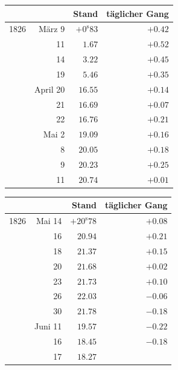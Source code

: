 \begin{center}
\begingroup\small\setlength{\tabcolsep}{5pt}
\begin{tabular}{lr|r|r}
 & & Stand & täglicher Gang \\
\hline
1826 & März 9 & $+0^{\mathrm s}83$ & $+0.42$ \\
 & 11 & $1.67$ & $+0.52$ \\
 & 14 & $3.22$ & $+0.45$ \\
 & 19 & $5.46$ & $+0.35$ \\
 & April 20 & $16.55$ & $+0.14$ \\
 & 21 & $16.69$ & $+0.07$ \\
 & 22 & $16.76$ & $+0.21$ \\
 & Mai 2 & $19.09$ & $+0.16$ \\
 & 8 & $20.05$ & $+0.18$ \\
 & 9 & $20.23$ & $+0.25$ \\
 & 11 & $20.74$ & $+0.01$ \\
\end{tabular}
\par\medskip
\begin{tabular}{lr|r|r}
 & & Stand & täglicher Gang \\
\hline
1826 & Mai 14 & $+20^{\mathrm s}78$ & $+0.08$ \\
 & 16 & $20.94$ & $+0.21$ \\
 & 18 & $21.37$ & $+0.15$ \\
 & 20 & $21.68$ & $+0.02$ \\
 & 23 & $21.73$ & $+0.10$ \\
 & 26 & $22.03$ & $-0.06$ \\
 & 30 & $21.78$ & $-0.18$ \\
 & Juni 11 & $19.57$ & $-0.22$ \\
 & 16 & $18.45$ & $-0.18$ \\
 & 17 & $18.27$ &  \\
\end{tabular}
\endgroup
\end{center}


